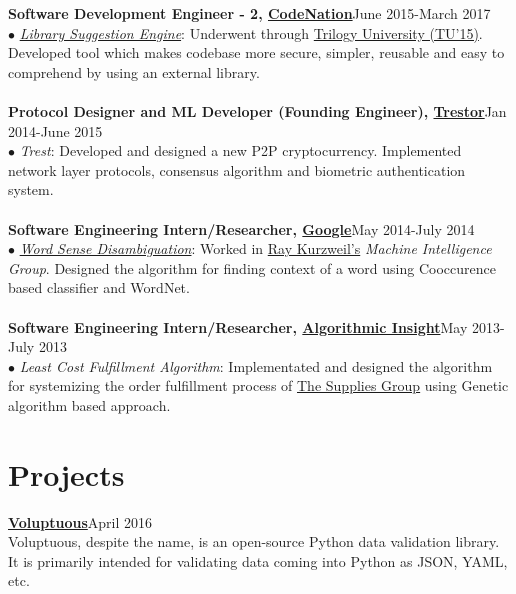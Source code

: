 \documentclass[margin,line]{resume}
\begin{document}
\begin{resume}
{\bf Software Development Engineer - 2, \href{http://codenation.co.in/}{CodeNation}}\hfill June 2015-March 2017\\
	$\bullet$ \href{https://patents.google.com/patent/US10048945B1/}{\emph{Library Suggestion Engine}}: Underwent through \href{https://hbr.org/2001/04/no-ordinary-boot-camp}{Trilogy University (TU'15)}. Developed tool which makes codebase more secure, simpler, reusable and easy to comprehend by using an external library.\\\\
     {\bf Protocol Designer and ML Developer (Founding Engineer), \href{https://www.linkedin.com/company/trestor-foundation/}{Trestor}}\hfill Jan 2014-June 2015\\
	$\bullet$ \emph{Trest}: Developed and designed a new P2P cryptocurrency. Implemented network layer protocols, consensus algorithm and biometric authentication system.\\\\
    {\bf Software Engineering Intern/Researcher, \href{https://www.google.com/}{Google}}\hfill May 2014-July 2014\\
      $\bullet$ \href{https://en.wikipedia.org/wiki/Word-sense_disambiguation}{\emph{Word Sense Disambiguation}}: Worked in \href{http://en.wikipedia.org/wiki/Ray_Kurzweil}{Ray Kurzweil's} \emph{Machine Intelligence Group}. Designed the algorithm for finding context of a word using Cooccurence based classifier and WordNet.\\\\
         {\bf Software Engineering Intern/Researcher, \href{http://tatrasdata.com/}{Algorithmic Insight}}\hfill May 2013-July 2013\\
      $\bullet$ \emph{Least Cost Fulfillment Algorithm}: Implementated and designed the algorithm for systemizing the order fulfillment process of \href{http://www.suppliesguys.com/}{The Supplies Group} using Genetic algorithm based approach.

\section{\mysidestyle \bf Projects}

 {\bf\href{https://github.com/alecthomas/voluptuous}{Voluptuous}}\hfill April 2016 \\
Voluptuous, despite the name, is an open-source Python data validation library. It is primarily intended for validating data coming into Python as JSON, YAML, etc.


\end{resume}
\end{document}
